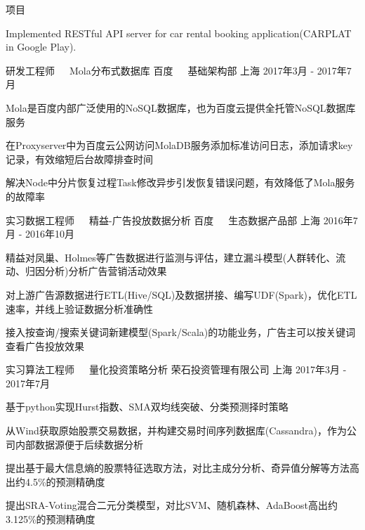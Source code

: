 \documentclass[11pt, a4paper, UTF8]{awesome-cv}
\begin{document}
\begin{cventries}
  \cventry
    {项目} %
    {} %
    {} %
    {\ } %
    {
      \begin{cvitems} %
        \item {Implemented RESTful API server for car rental booking application(CARPLAT in Google Play).}
      \end{cvitems}
    }
    
  \cventry
    {研发工程师{\ \cdotp\ \ }Mola分布式数据库} %
    {百度{\ \cdotp\ \ }基础架构部} %
    {上海} %
    {2017年3月 - 2017年7月} %
    {
      \begin{cvitems} %
        \item {Mola是百度内部广泛使用的NoSQL数据库，也为百度云提供全托管NoSQL数据库服务}
        \item {在Proxyserver中为百度云公网访问MolaDB服务添加标准访问日志，添加请求key记录，有效缩短后台故障排查时间}
        \item {解决Node中分片恢复过程Task修改异步引发恢复错误问题，有效降低了Mola服务的故障率}
      \end{cvitems}
    }

  \cventry
    {实习数据工程师{\ \cdotp\ \ }精益-广告投放数据分析} %
    {百度{\ \cdotp\ \ }生态数据产品部} %
    {上海} %
    {2016年7月 - 2016年10月} %
    {
      \begin{cvitems} %
        \item {精益对凤巢、Holmes等广告数据进行监测与评估，建立漏斗模型(人群转化、流动、归因分析)分析广告营销活动效果}
        \item {对上游广告源数据进行ETL(Hive/SQL)及数据拼接、编写UDF(Spark)，优化ETL速率，并线上验证数据分析准确性}
        \item {接入按查询/搜索关键词新建模型(Spark/Scala)的功能业务，广告主可以按关键词查看广告投放效果}
      \end{cvitems}
    }
        
  \cventry
    {实习算法工程师{\ \cdotp\ \ }量化投资策略分析} %
    {荣石投资管理有限公司} %
    {上海} %
    {2017年3月 - 2017年7月} %
    {
      \begin{cvitems} %
        \item {基于python实现Hurst指数、SMA双均线突破、分类预测择时策略}
        \item {从Wind获取原始股票交易数据，并构建交易时间序列数据库(Cassandra)，作为公司内部数据源便于后续数据分析}
        \item {提出基于最大信息熵的股票特征选取方法，对比主成分分析、奇异值分解等方法高出约4.5\%的预测精确度}
        \item {提出SRA-Voting混合二元分类模型，对比SVM、随机森林、AdaBoost高出约3.125\%的预测精确度}
      \end{cvitems}
    }
    

\end{cventries}
\end{document}
